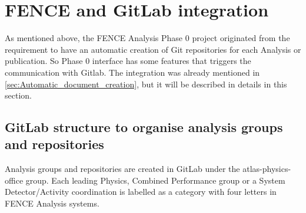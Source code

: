 
\section{FENCE and GitLab integration}%
\label{sec:FENCE_and_Gitlab_integration}

As mentioned above, the FENCE Analysis Phase 0 project originated from the requirement to have an automatic creation of Git repositories for each Analysis or publication. So Phase 0 interface has some features that triggers the communication with Gitlab. The integration was already mentioned in \ref{sec:Automatic_document_creation}, but it will be described in details in this section.

\subsection{GitLab structure to organise analysis groups and repositories}%
\label{sec:Gitlab_structure_to_organise_Analysis_groups_and_repositories}

Analysis groups and repositories are created in GitLab under the atlas-physics-office group. Each leading Physics, Combined Performance group or a System Detector/Activity coordination is labelled as a category with four letters in FENCE Analysis systems.

